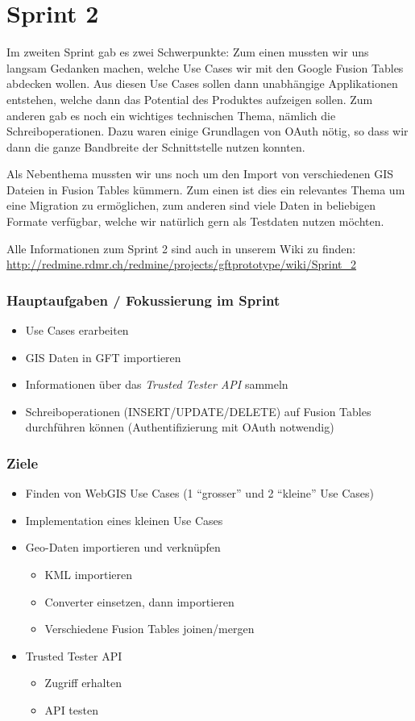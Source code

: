 \section{Sprint 2}

Im zweiten Sprint gab es zwei Schwerpunkte: Zum einen mussten wir uns langsam Gedanken machen, welche Use Cases wir mit den Google Fusion Tables abdecken wollen. Aus diesen Use Cases sollen dann unabhängige Applikationen entstehen, welche dann das Potential des Produktes aufzeigen sollen. Zum anderen gab es noch ein wichtiges technischen Thema, nämlich die Schreiboperationen. Dazu waren einige Grundlagen von \gls{OAuth} nötig, so dass wir dann die ganze Bandbreite der Schnittstelle nutzen konnten.

Als Nebenthema mussten wir uns noch um den Import von verschiedenen \gls{GIS} Dateien in Fusion Tables kümmern. Zum einen ist dies ein relevantes Thema um eine Migration zu ermöglichen, zum anderen sind viele Daten in beliebigen Formate verfügbar, welche wir natürlich gern als Testdaten nutzen möchten.

Alle Informationen zum Sprint 2 sind auch in unserem Wiki zu finden:
\url{http://redmine.rdmr.ch/redmine/projects/gftprototype/wiki/Sprint_2}

\subsubsection{Hauptaufgaben / Fokussierung im Sprint}
\begin{itemize}
	\item Use Cases erarbeiten
	\item \gls{GIS} Daten in GFT importieren
	\item Informationen über das \emph{Trusted Tester \gls{API}} sammeln
	\item Schreiboperationen (INSERT/UPDATE/DELETE) auf Fusion Tables durchführen können (Authentifizierung mit \gls{OAuth} notwendig)
\end{itemize}

\subsubsection{Ziele}
\begin{itemize}
	\item Finden von Web\gls{GIS} Use Cases (1 "`grosser"' und 2 "`kleine"' Use Cases)
	\item Implementation eines kleinen Use Cases
	\item Geo-Daten importieren und verknüpfen
	\begin{itemize}
		\item \gls{KML} importieren
		\item Converter einsetzen, dann importieren
		\item Verschiedene Fusion Tables joinen/mergen
	\end{itemize}
	\item Trusted Tester \gls{API}
	\begin{itemize}
		\item Zugriff erhalten
		\item \gls{API} testen
	\end{itemize}
\end{itemize}

